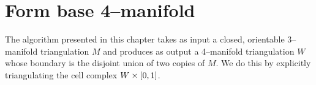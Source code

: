 \section{Form base 4--manifold}

The algorithm presented in this chapter takes as input a closed, orientable 3--manifold triangulation $M$ and produces as output a 4--manifold triangulation $W$ whose boundary is the disjoint union of two copies of $M$.
We do this by explicitly triangulating the cell complex $W\times[0,1]$.